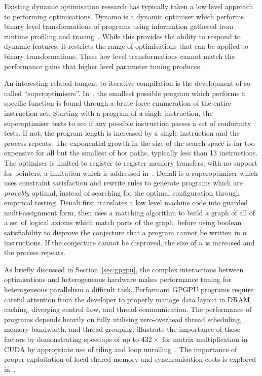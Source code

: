 Existing dynamic optimisation research has typically taken a low level
approach to performing optimisations. Dynamo is a dynamic optimiser
which performs binary level transformations of programs using
information gathered from runtime profiling and
tracing~\cite{Bala2000}. While this provides the ability to respond to
dynamic features, it restricts the range of optimisations that can be
applied to binary transformations. These low level transformations
cannot match the performance gains that higher level parameter tuning
produces.

An interesting related tangent to iterative compilation is the
development of so-called ``superoptimisers''. In~\cite{Massalin1987},
the smallest possible program which performs a specific function is
found through a brute force enumeration of the entire instruction
set. Starting with a program of a single instruction, the
superoptimiser tests to see if any possible instruction passes a set
of conformity tests. If not, the program length is increased by a
single instruction and the process repeats. The exponential growth in
the size of the search space is far too expensive for all but the
smallest of hot paths, typically less than 13 instructions. The
optimiser is limited to register to register memory transfers, with no
support for pointers, a limitation which is addressed
in~\cite{Joshi2002}. Denali is a superoptimiser which uses constraint
satisfaction and rewrite rules to generate programs which are
\emph{provably} optimal, instead of searching for the optimal
configuration through empirical testing. Denali first translates a low
level machine code into guarded multi-assignment form, then uses a
matching algorithm to build a graph of all of a set of logical axioms
which match parts of the graph, before using boolean satisfiability to
disprove the conjecture that a program cannot be written in $n$
instructions. If the conjecture cannot be disproved, the size of $n$
is increased and the process repeats.



As briefly discussed in Section~\ref{sec:gpgpu}, the complex
interactions between optimisations and heterogeneous hardware makes
performance tuning for heterogeneous parallelism a difficult
task. Performant GPGPU programs require careful attention from the
developer to properly manage data layout in DRAM, caching, diverging
control flow, and thread communication. The performance of programs
depends heavily on fully utilising zero-overhead thread scheduling,
memory bandwidth, and thread grouping. \citeauthor{Ryoo2008a}
illustrate the importance of these factors by demonstrating speedups
of up to $432\times$ for matrix multiplication in CUDA by appropriate
use of tiling and loop unrolling~\cite{Ryoo2008a}. The importance of
proper exploitation of local shared memory and synchronisation costs
is explored in~\cite{Lee2010}.

